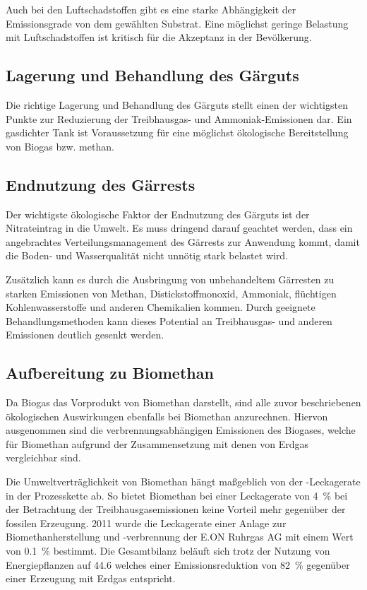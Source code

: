 Auch bei den Luftschadstoffen gibt es eine starke Abhängigkeit der Emissionsgrade von dem gewählten Substrat. Eine möglichst geringe Belastung mit Luftschadstoffen ist kritisch für die Akzeptanz in der Bevölkerung. \parencite{Paolini2018}

\subsection{Lagerung und Behandlung des Gärguts}\label{chap:digestate_storage}

Die richtige Lagerung und Behandlung des Gärguts stellt einen der wichtigsten Punkte zur Reduzierung der Treibhausgas- und Ammoniak-Emissionen dar. Ein gasdichter Tank ist Voraussetzung für eine möglichst ökologische Bereitstellung von Biogas bzw. methan. \parencite{Paolini2018}


\subsection{Endnutzung des Gärrests}\label{chap:digestate_use}

Der wichtigste ökologische Faktor der Endnutzung des Gärguts ist der Nitrateintrag in die Umwelt. Es muss dringend darauf geachtet werden, dass ein angebrachtes Verteilungsmanagement des Gärrests zur Anwendung kommt, damit die Boden- und Wasserqualität nicht unnötig stark belastet wird.\smallskip

Zusätzlich kann es durch die Ausbringung von unbehandeltem Gärresten zu starken Emissionen von Methan, Distickstoffmonoxid, Ammoniak, flüchtigen Kohlenwasserstoffe und anderen Chemikalien kommen. Durch geeignete Behandlungsmethoden kann dieses Potential an Treibhausgas- und anderen Emissionen deutlich gesenkt werden. \parencite{Paolini2018}


\subsection{Aufbereitung zu Biomethan}\label{chap:eco_biomethane}

Da Biogas das Vorprodukt von Biomethan darstellt, sind alle zuvor beschriebenen ökologischen Auswirkungen ebenfalls bei Biomethan anzurechnen. Hiervon ausgenommen sind die verbrennungsabhängigen Emissionen des Biogases, welche für Biomethan aufgrund der Zusammensetzung mit denen von Erdgas vergleichbar sind.\smallskip

Die Umweltverträglichkeit von Biomethan hängt maßgeblich von der -Leckagerate in der Prozesskette ab. So bietet Biomethan bei einer Leckagerate von \SI{4}{\percent} bei der Betrachtung der Treibhausgasemissionen keine Vorteil mehr gegenüber der fossilen Erzeugung. \SI{2011}{\relax} wurde die Leckagerate einer Anlage zur Biomethanherstellung und -verbrennung der E.ON Ruhrgas AG mit einem Wert von \SI{0.1}{\percent} bestimmt. Die Gesamtbilanz beläuft sich trotz der Nutzung von Energiepflanzen  auf \SI[per-mode=symbol]{44.6}{\gcoeqkwh} welches einer Emissionsreduktion von \SI{82}{\percent} gegenüber einer Erzeugung mit Erdgas entspricht. \parencite{Adelt2011} \parencite{Ravina2015} \smallskip

